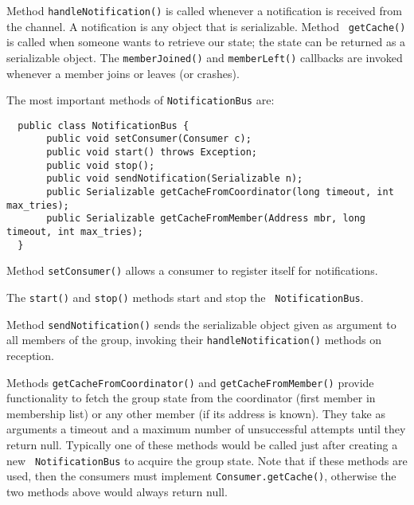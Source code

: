   Method {\tt handleNotification()} is called whenever a notification is received
  from the channel. A notification is any object that is serializable. Method {\tt
  getCache()} is called when someone wants to retrieve our state; the state can be
  returned as a serializable object. The {\tt memberJoined()} and {\tt memberLeft()}
  callbacks are invoked whenever a member joins or leaves (or crashes).

  The most important methods of {\tt NotificationBus} are:

  \begin{small}
  \begin{verbatim}
  public class NotificationBus {
       public void setConsumer(Consumer c);
       public void start() throws Exception;
       public void stop();
       public void sendNotification(Serializable n);
       public Serializable getCacheFromCoordinator(long timeout, int max_tries);
       public Serializable getCacheFromMember(Address mbr, long timeout, int max_tries);
  }
  \end{verbatim}
  \end{small}

  Method {\tt setConsumer()} allows a consumer to register itself for notifications.

  The {\tt start()} and {\tt stop()} methods start and stop the {\tt
  NotificationBus}.

  Method {\tt sendNotification()} sends the serializable object given as argument to
  all members of the group, invoking their {\tt handleNotification()} methods on
  reception.

  Methods {\tt getCacheFromCoordinator()} and {\tt getCacheFromMember()} provide
  functionality to fetch the group state from the coordinator (first member in
  membership list) or any other member (if its address is known). They take as
  arguments a timeout and a maximum number of unsuccessful attempts until they return
  null. Typically one of these methods would be called just after creating a new {\tt
  NotificationBus} to acquire the group state. Note that if these methods are used,
  then the consumers must implement {\tt Consumer.getCache()}, otherwise the two
  methods above would always return null.
